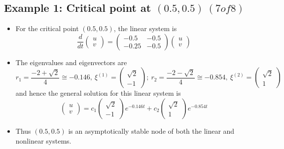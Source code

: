 \documentclass[11pt,a4paper]{article}
\begin{document}
	\subsection*{Example 1: Critical point at $(0.5,0.5)\ (7 of 8)$}
	\begin{itemize}
		\item For the critical point $(0.5,0.5)$, the linear system is
		$$
		\frac{d}{dt}
		\begin{pmatrix}
			u\\
			v
		\end{pmatrix} =
		\begin{pmatrix}
			-0.5 & -0.5\\
			-0.25 & -0.5
		\end{pmatrix}
		\begin{pmatrix}
			u\\
			v
		\end{pmatrix}
		$$
		\item The eigenvalues and eigenvectors are
		$$
		r_1 = \frac{-2 + \sqrt{2}}{4}\cong -0.146,\ \xi^{(1)} =
		\begin{pmatrix}
			\sqrt{2}\\
			-1
		\end{pmatrix};\ r_2 = \frac{-2 - \sqrt{2}}{4} \cong -0.854,\ \xi^{(2)}=
		\begin{pmatrix}
			\sqrt{2}\\
			1
		\end{pmatrix}
		$$
		and hence the general solution for this linear system is
		$$
		\begin{pmatrix}
			u\\
			v
		\end{pmatrix} = c_1
		\begin{pmatrix}
			\sqrt{2}\\
			-1
		\end{pmatrix}e^{-0.146t} + c_2
		\begin{pmatrix}
			\sqrt{2}\\
			1
		\end{pmatrix}e^{-0.854t}
		$$
		\item Thus $(0.5,0.5)$ is an asymptotically stable node of both the linear and nonlinear systems.
	\end{itemize}
\end{document}
